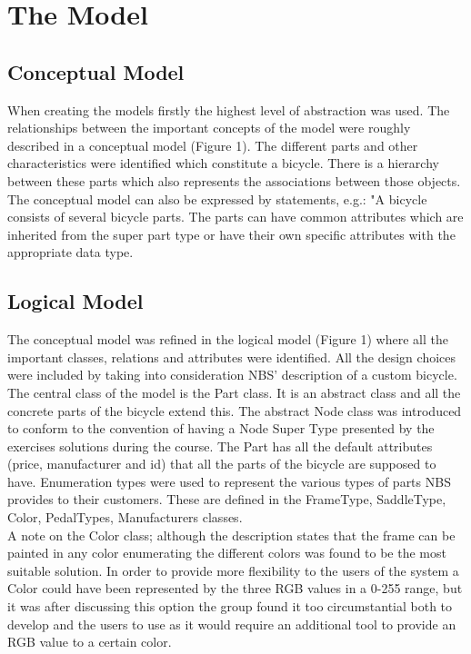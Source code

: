 \section{The Model}
\label{sec.logical_model}

\subsection{Conceptual Model}
\noindent When creating the models firstly the highest level of 
abstraction was used. The relationships between the important concepts 
of the model were roughly described in a conceptual model (Figure 1). 
The different parts and other characteristics were identified which 
constitute a bicycle. There is a hierarchy between these parts which 
also represents the associations between those objects. The conceptual 
model can also be expressed by statements, e.g.: "A bicycle consists of 
several bicycle parts. The parts can have common attributes which are 
inherited from the super part type or have their own specific attributes 
with the appropriate data type. 

\subsection{Logical Model}
\noindent The conceptual model was refined in the logical model (Figure 1) where
all the important classes, relations and attributes were identified. 
All the design choices were included by taking into consideration NBS' 
description of a custom bicycle.\\

\noindent The central class of the model is the Part class. It is an abstract
class and all the concrete parts of the bicycle extend this. The abstract Node 
class was introduced to conform to the convention of having a Node Super 
Type presented by the exercises solutions during the course. 
The Part has all the default attributes (price, manufacturer and id) 
that all the parts of the bicycle are supposed to have. Enumeration types 
were used to represent the various types of parts NBS provides to their 
customers. These are defined in the FrameType, SaddleType, Color, 
PedalTypes, Manufacturers classes.\\

\noindent A note on the Color class; although the description states that the 
frame can be painted in any color enumerating the different colors was 
found to be the most suitable solution. In order to provide more 
flexibility to the users of the system a Color could have been 
represented by the three RGB values in a 0-255 range, but it was 
after discussing this option the group found it too circumstantial 
both to develop and the users to use as it would require an additional 
tool to provide an RGB value to a certain color.\\

